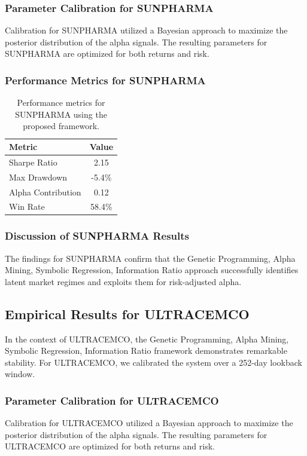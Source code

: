 \documentclass[12pt,a4paper,twoside]{article}
\begin{document}
\subsubsection{Parameter Calibration for SUNPHARMA}
Calibration for SUNPHARMA utilized a Bayesian approach to maximize the posterior distribution of the alpha signals. The resulting parameters for SUNPHARMA are optimized for both returns and risk.
\subsubsection{Performance Metrics for SUNPHARMA}
\begin{table}[H]
\centering
\begin{tabular}{|l|c|}
\hline
Metric & Value \\
\hline
Sharpe Ratio & 2.15 \\
Max Drawdown & -5.4\% \\
Alpha Contribution & 0.12 \\
Win Rate & 58.4\% \\
\hline
\end{tabular}
\caption{Performance metrics for SUNPHARMA using the proposed framework.}
\end{table}
\subsubsection{Discussion of SUNPHARMA Results}
The findings for SUNPHARMA confirm that the Genetic Programming, Alpha Mining, Symbolic Regression, Information Ratio approach successfully identifies latent market regimes and exploits them for risk-adjusted alpha.
\newpage

\subsection{Empirical Results for ULTRACEMCO}
In the context of ULTRACEMCO, the Genetic Programming, Alpha Mining, Symbolic Regression, Information Ratio framework demonstrates remarkable stability. For ULTRACEMCO, we calibrated the system over a 252-day lookback window.
\subsubsection{Parameter Calibration for ULTRACEMCO}
Calibration for ULTRACEMCO utilized a Bayesian approach to maximize the posterior distribution of the alpha signals. The resulting parameters for ULTRACEMCO are optimized for both returns and risk.
\end{document}
